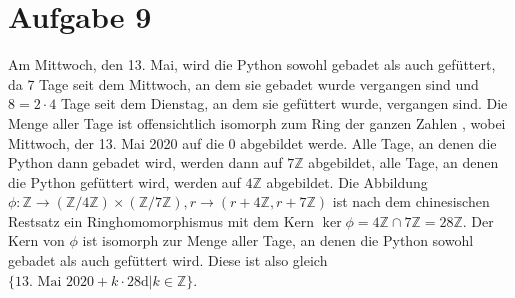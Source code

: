 \documentclass{article}
\theoremstyle{definition}
\newcommand{\Z}{\mathbb{Z}}
\begin{document}
\section*{Aufgabe 9}
Am Mittwoch, den 13. Mai, wird die Python sowohl gebadet als auch gefüttert, da 7 Tage seit dem Mittwoch, an dem sie gebadet wurde vergangen sind und $8 = 2\cdot 4$ Tage seit dem Dienstag, an dem sie gefüttert wurde, vergangen sind. Die Menge aller Tage ist offensichtlich isomorph zum Ring der ganzen Zahlen , wobei Mittwoch, der 13. Mai 2020 auf die 0 abgebildet werde. Alle Tage, an denen die Python dann gebadet wird, werden dann auf $7\Z$ abgebildet, alle Tage, an denen die Python gefüttert wird, werden auf $4\Z$ abgebildet. Die Abbildung 
$\phi: \Z \to (\Z/4\Z) \times (\Z/7\Z), r\to (r+ 4\Z, r+ 7\Z)$ ist nach dem chinesischen Restsatz ein Ringhomomorphismus mit dem Kern $\ker \phi = 4\Z \cap 7\Z = 28\Z$. Der Kern von $\phi$ ist isomorph zur Menge aller Tage, an denen die Python sowohl gebadet als auch gefüttert wird. Diese ist also gleich $\{\text{13. Mai 2020} + k \cdot 28\mathrm{d}|k\in \Z\}$.
\end{document}
